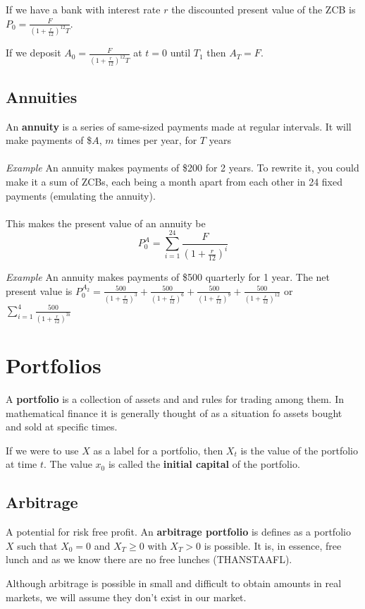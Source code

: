 \documentclass[12pt,letterpaper, twocolumn]{article}
\begin{document}
If we have a bank with interest rate $r$ the discounted present value of the ZCB is $P_0 = \frac{F}{(1+\frac{r}{12})^12T}$. 

If we deposit $A_0 = \frac{F}{(1+\frac{r}{12})^12T}$ at $t=0$ until $T_1$ then $A_T = F$. 

\subsection{Annuities}
An \textbf{annuity} is a series of same-sized payments made at regular intervals. It will make payments of \$$A$, $m$ times per year, for $T$ years
\\\\
\textit{Example}
An annuity makes payments of \$200 for 2 years. To rewrite it, you could make it a sum of ZCBs, each being a month apart from each other in 24 fixed payments (emulating the annuity). 
\\\\
This makes the present value of an annuity be
 \[P_0^A = \sum_{i=1}^{24}\frac{F}{(1+\frac{r}{12})^i}\]


\textit{Example}
An annuity makes payments of \$500 quarterly for 1 year. The net present value is $P_0^{A_2}= \frac{500}{(1+\frac{r}{12})^3} + \frac{500}{(1+\frac{r}{12})^6} + \frac{500}{(1+\frac{r}{12})^9} + \frac{500}{(1+\frac{r}{12})^{12}}$ or $\sum_{i=1}^{4}\frac{500}{(1+\frac{r}{12})^{3i}}$

\section{Portfolios}
A \textbf{portfolio} is a collection of assets and and rules for trading among them. In mathematical finance it is generally thought of as a situation fo assets bought and sold at specific times. 

If we were to use $X$ as a label for a portfolio, then $X_t$ is the value of the portfolio at time $t$. The value $x_0$ is called the \textbf{initial capital} of the portfolio. 

\subsection{Arbitrage}
A potential for risk free profit. 
An \textbf{arbitrage portfolio} is defines as a portfolio $X$ such that $X_0 = 0$ and $X_T \geq 0$ with $X_T > 0$ is possible. It is, in essence, free lunch and as we know there are no free lunches (THANSTAAFL). 

Although arbitrage is possible in small and difficult to obtain amounts in real markets, we will assume they don't exist in our market. 
\end{document}

